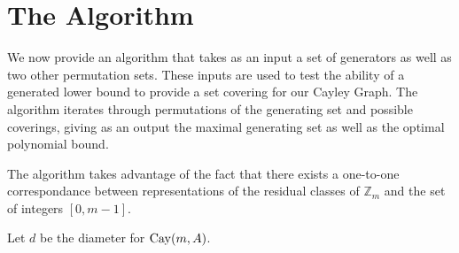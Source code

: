\section{The Algorithm}

We now provide an algorithm that takes as an input a set of generators as well as two other permutation sets. These inputs are used to test the ability of a generated lower bound to provide a set covering for our Cayley Graph. The algorithm iterates through permutations of the generating set and possible coverings, giving as an output the maximal generating set as well as the optimal polynomial bound.

\noindent
The algorithm takes advantage of the fact that there exists a one-to-one correspondance between representations of the residual classes of $\mathbb{Z}_{m}$ and the set of integers $[0, m-1]$.\n

\noindent
Let $d$ be the diameter for $\operatorname{Cay}(m, A)$.\n 

